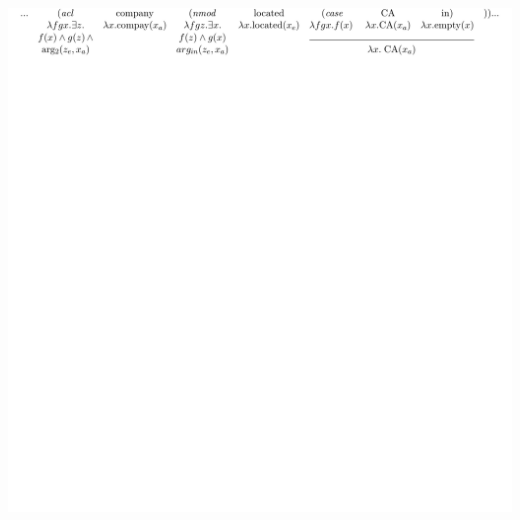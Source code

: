 \documentclass[mathserif,12pt]{beamer}
\begin{document}
\begin{frame}
\begin{center}
{\includegraphics[trim=30.6em 45em 6em 3em,clip=true,scale=0.9]{figures/dependency-reduced-relative-derivation-ud}\vspace{2em}}

\end{center}
\end{frame}
\end{document}
